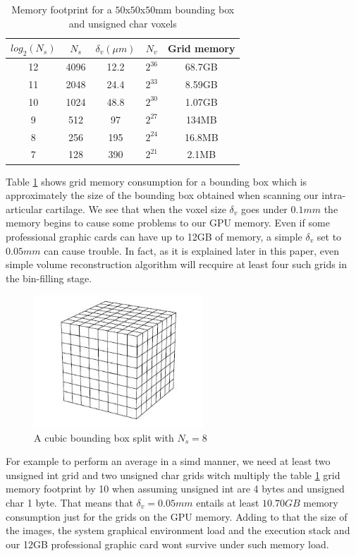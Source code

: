 \documentclass[12pt,journal,compsoc]{IEEEtran}
\begin{document}
\begin{table}[!t]
\renewcommand{\arraystretch}{1.3}
\caption{Memory footprint for a $50$x$50$x$50$mm bounding box and unsigned char voxels}
\label{memory_table}
\centering
\begin{tabular}{|c|c||c|c||c|}
\hline
$log_2(N_s)$ & $N_s$ & $\delta_v (\mu m)$ & $N_v$ & Grid memory \\
\hline
12 & 4096 & 12.2 & $2^{36}$ & 68.7GB\\\hline
11 & 2048 & 24.4 & $2^{33}$ & 8.59GB\\\hline
10 & 1024 & 48.8 & $2^{30}$ & 1.07GB\\\hline
9 & 512 & 97 & $2^{27}$ & 134MB\\\hline
8 & 256 & 195 & $2^{24}$ & 16.8MB\\\hline
7 & 128 & 390 & $2^{21}$ & 2.1MB\\\hline
\end{tabular}
\end{table}
Table \ref{memory_table} shows grid memory consumption for a bounding box which is approximately the size of the bounding box obtained when scanning our intra-articular cartilage.
We see that when the voxel size $\delta_v$ goes under $0.1mm$ the memory begins to cause some problems to our GPU memory.
Even if some professional graphic cards can have up to 12GB of memory, a simple $\delta_v$ set to $0.05mm$ can cause trouble.
In fact, as it is explained later in this paper, even simple volume reconstruction algorithm will recquire at least four such grids in the bin-filling stage.

\begin{figure}[!h]
\centering
\includegraphics[width=2.5in]{grid}
\caption{A cubic bounding box split with $N_s=8$}
\label{fig_2}
\end{figure}

For example to perform an average in a \acl{simd} manner, we need at least two unsigned int grid and two unsigned char grids witch multiply the table \ref{memory_table} grid memory footprint by 10 when assuming unsigned int are 4 bytes and unsigned char 1 byte.
That means that $\delta_v=0.05mm$ entails at least $10.70GB$ memory consumption just for the grids on the GPU memory.
Adding to that the size of the images, the system graphical environment load and the execution stack and our 12GB professional graphic card wont survive under such memory load.
\end{document}

